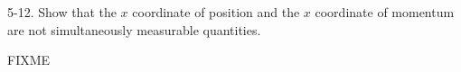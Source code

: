 \documentclass[12pt]{article}
\begin{document}
5-12.
Show that the $x$ coordinate of position and the
$x$ coordinate of momentum are not simultaneously
measurable quantities.

\bigskip
FIXME
\end{document}
